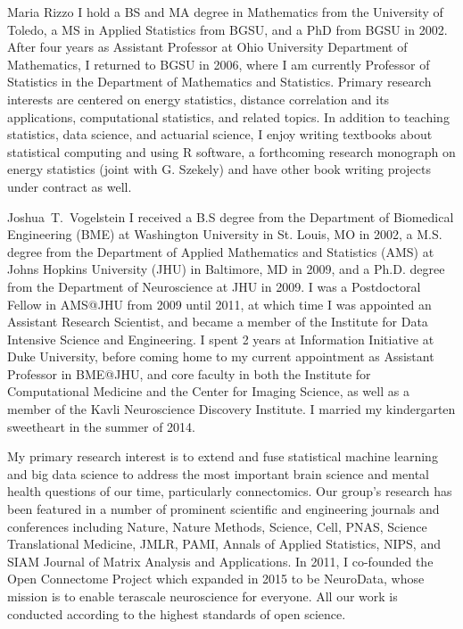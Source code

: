 \begin{IEEEbiography}{Maria Rizzo}
I hold a BS and MA degree in Mathematics from the University of Toledo, a MS in Applied Statistics
from BGSU, and a PhD from BGSU in 2002. After four years as Assistant Professor at Ohio University
Department of Mathematics, I returned to BGSU in 2006, where I am currently Professor of Statistics in
the Department of Mathematics and Statistics. Primary research interests are centered on energy statistics,
distance correlation and its applications, computational statistics, and related topics. In addition
to teaching statistics, data science, and actuarial science, I enjoy writing textbooks about
statistical computing and using R software, a forthcoming research monograph on energy statistics 
(joint with G. Szekely) and have other book writing projects under contract as well. 
\end{IEEEbiography}


\begin{IEEEbiography}{Joshua~T.~Vogelstein}
I received a B.S degree from the Department of Biomedical Engineering (BME) at Washington University in St. Louis, MO in 2002, a M.S. degree from the Department of Applied Mathematics and Statistics (AMS) at Johns Hopkins University (JHU) in Baltimore, MD in 2009, and a Ph.D. degree from the Department of Neuroscience at JHU in 2009. I was a Postdoctoral Fellow in AMS@JHU from 2009 until 2011, at which time I was appointed an Assistant Research Scientist, and became a member of the Institute for Data Intensive Science and Engineering. I spent 2 years at Information Initiative at Duke University, before coming home to my current appointment as Assistant Professor in BME@JHU, and core faculty in both the Institute for Computational Medicine and the Center for Imaging Science, as well as a member of the Kavli Neuroscience Discovery Institute. I married my kindergarten sweetheart in the summer of 2014.

My primary research interest is to extend and fuse statistical machine learning and big data science to address the most important brain science and mental health questions of our time, particularly  connectomics. Our group’s research has been featured in a number of prominent scientific and engineering journals and conferences including Nature, Nature Methods, Science, Cell, PNAS, Science Translational Medicine, JMLR, PAMI, Annals of Applied Statistics,  NIPS, and SIAM Journal of Matrix Analysis and Applications. In 2011, I co-founded the Open Connectome Project which expanded in 2015 to be NeuroData, whose mission is to enable terascale neuroscience for everyone. All our work is conducted according to the highest standards of open science.
\end{IEEEbiography}

